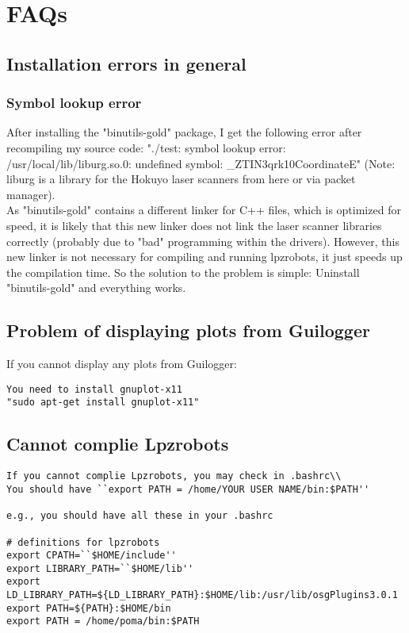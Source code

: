 \section{FAQs}

\subsection{Installation errors in general}

\subsubsection{Symbol lookup error}
After installing the "binutils-gold" package, I get the following error after recompiling my source code:
"./test: symbol lookup error: /usr/local/lib/liburg.so.0: undefined symbol: \_ZTIN3qrk10CoordinateE"
(Note: liburg is a library for the Hokuyo laser scanners from here or via packet manager).\\

As "binutils-gold" contains a different linker for C++ files, which is optimized for speed, it is likely that this new linker does not link the laser scanner libraries correctly (probably due to "bad" programming within the drivers).
However, this new linker is not necessary for compiling and running lpzrobots, it just speeds up the compilation time.
So the solution to the problem is simple: Uninstall "binutils-gold" and everything works.

\subsection{Problem of displaying plots from Guilogger}
If you cannot display any plots from Guilogger:\\
\begin{lstlisting}
You need to install gnuplot-x11
"sudo apt-get install gnuplot-x11"
\end{lstlisting}

\subsection{Cannot complie Lpzrobots}

\begin{lstlisting}
If you cannot complie Lpzrobots, you may check in .bashrc\\
You should have ``export PATH = /home/YOUR USER NAME/bin:$PATH''

e.g., you should have all these in your .bashrc

# definitions for lpzrobots
export CPATH=``$HOME/include''
export LIBRARY_PATH=``$HOME/lib''
export LD_LIBRARY_PATH=${LD_LIBRARY_PATH}:$HOME/lib:/usr/lib/osgPlugins3.0.1
export PATH=${PATH}:$HOME/bin
export PATH = /home/poma/bin:$PATH

\end{lstlisting}




